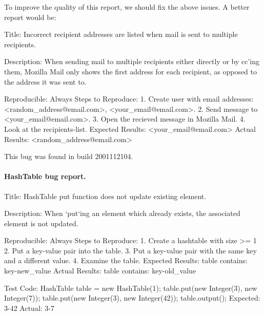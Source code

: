\documentclass[12pt]{article}
\begin{document}
To improve the quality of this report, we should fix the above issues. A better report would be:
\begin{verbnobox}[\scriptsize]
Title:
Incorrect recipient addresses are listed when mail is sent to multiple recipients.

Description:
When sending mail to multiple recipients either directly or by cc'ing them, Mozilla Mail
only shows the first address for each recipient, as opposed to the address it was sent to.

Reproducible: Always
Steps to Reproduce:
1. Create user with email addresses: <random_address@email.com>, <your_email@email.com>.
2. Send message to <your_email@email.com>.
3. Open the recieved message in Mozilla Mail.
4. Look at the recipients-list.
Expected Results: <your_email@email.com>
Actual Results: <random_address@email.com>

This bug was found in build 2001112104.
\end{verbnobox}

\paragraph{HashTable bug report.}
\begin{verbnobox}[\scriptsize]
Title:
HashTable put function does not update existing element.

Description:
When `put`ing an element which already exists, the associated element is not updated.

Reproducible: Always
Steps to Reproduce:
1. Create a hashtable with size >= 1
2. Put a key-value pair into the table.
3. Put a key-value pair with the same key and a different value.
4. Examine the table.
Expected Results: table contains: key-new_value
Actual Results: table contains: key-old_value

Test Code:
HashTable table = new HashTable(1);
table.put(new Integer(3), new Integer(7));
table.put(new Integer(3), new Integer(42));
table.output();
Expected: 3-42
Actual: 3-7
\end{verbnobox}
\end{document}
